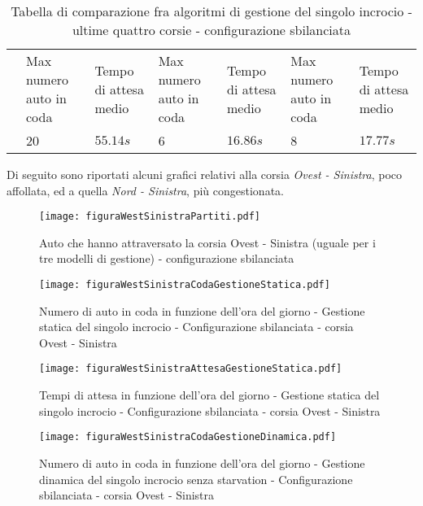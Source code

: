 \begin{table}[H]
\begin{tabular}{|C{2cm}|C{1.65cm}|C{1.65cm}|C{1.65cm}|C{1.65cm}|C{1.65cm}|C{1.65cm}|}
  & \scriptsize{Max numero auto in coda}
  & \scriptsize{Tempo di attesa medio}
  & \scriptsize{Max numero auto in coda}
  & \scriptsize{Tempo di attesa medio}
  & \scriptsize{Max numero auto in coda}
  & \scriptsize{Tempo di attesa medio}\\
  & 20
  & $55.14s$
  & 6
  & $16.86s$
  & 8
  & $17.77s$\\\hline
\end{tabular}
\caption{Tabella di comparazione fra algoritmi di gestione del singolo incrocio
- ultime quattro corsie - configurazione sbilanciata}
\label{table:keytable}
\end{table}

Di seguito sono riportati alcuni grafici relativi alla corsia \textit{Ovest - Sinistra}, poco affollata, ed a quella \textit{Nord - Sinistra}, più congestionata.
\newpage
\begin{figure}[H]
\centering
  \texttt{[image: figuraWestSinistraPartiti.pdf]}
  \caption{Auto che hanno attraversato la corsia Ovest - Sinistra (uguale per i tre modelli di gestione) - configurazione sbilanciata}
  \label{fig:partitiMuSbil}
\end{figure}
\begin{figure}[H]
\centering
  \texttt{[image: figuraWestSinistraCodaGestioneStatica.pdf]}
  \caption{Numero di auto in coda in funzione dell'ora del giorno - Gestione statica del singolo incrocio - Configurazione sbilanciata - corsia Ovest - Sinistra}
  \label{fig:}
\end{figure}

\newpage

\begin{figure}[H]
\centering
  \texttt{[image: figuraWestSinistraAttesaGestioneStatica.pdf]}
  \caption{Tempi di attesa in funzione dell'ora del giorno - Gestione statica del singolo incrocio - Configurazione sbilanciata - corsia Ovest - Sinistra}
  \label{fig:}
\end{figure}
\begin{figure}[H]
\centering
  \texttt{[image: figuraWestSinistraCodaGestioneDinamica.pdf]}
  \caption{Numero di auto in coda in funzione dell'ora del giorno - Gestione dinamica del singolo incrocio senza starvation - Configurazione sbilanciata - corsia Ovest - Sinistra}
  \label{fig:}
\end{figure}

\newpage

